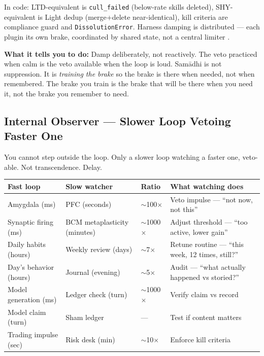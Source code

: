 \documentclass[11pt]{article}
\begin{document}
{\sloppy In code: LTD-equivalent is \texttt{cull\_failed} (below-rate skills deleted), SHY-equivalent is Light dedup (merge+delete near-identical), kill criteria are compliance guard and \texttt{DissolutionError}. Harness damping is distributed --- each plugin its own brake, coordinated by shared state, not a central limiter \citep{lin2026ahe}.


\textbf{What it tells you to do:} Damp deliberately, not reactively. The veto practiced when calm is the veto available when the loop is loud. Sam\=adhi is not suppression. It is \emph{training the brake} so the brake is there when needed, not when remembered. The brake you train is the brake that will be there when you need it, not the brake you remember to need.

\subsection{Internal Observer --- Slower Loop Vetoing Faster One}

You cannot step outside the loop. Only a slower loop watching a faster one, veto-able. Not transcendence. Delay.

\begin{center}
\small
\begin{tabular}{p{2.8cm}p{2.8cm}p{1.4cm}p{4.2cm}}
\toprule
Fast loop & Slow watcher & Ratio & What watching does \\
\midrule
Amygdala (ms) & PFC (seconds) & $\sim$100$\times$ & Veto impulse --- ``not now, not this'' \\
Synaptic firing (ms) & BCM metaplasticity (minutes) & $\sim$1000$\times$ & Adjust threshold --- ``too active, lower gain'' \\
Daily habits (hours) & Weekly review (days) & $\sim$7$\times$ & Retune routine --- ``this week, 12 times, still?'' \\
Day's behavior (hours) & Journal (evening) & $\sim$5$\times$ & Audit --- ``what actually happened vs storied?'' \\
Model generation (ms) & Ledger check (turn) & $\sim$1000$\times$ & Verify claim vs record \\
Model claim (turn) & Sham ledger & --- & Test if content matters \\
Trading impulse (sec) & Risk desk (min) & $\sim$10$\times$ & Enforce kill criteria \\
\bottomrule
\end{tabular}
\end{center}

}
\end{document}
